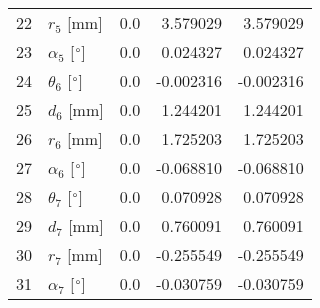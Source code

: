 \documentclass{standalone}%
\begin{document}
\begin{tabular}{llrrr}
22 &              $r_{5}$ [mm] &       0.0 &   3.579029 &   3.579029 \\
23 &  $\alpha_{5}$ [$\degree$] &       0.0 &   0.024327 &   0.024327 \\
24 &  $\theta_{6}$ [$\degree$] &       0.0 &  -0.002316 &  -0.002316 \\
25 &              $d_{6}$ [mm] &       0.0 &   1.244201 &   1.244201 \\
26 &              $r_{6}$ [mm] &       0.0 &   1.725203 &   1.725203 \\
27 &  $\alpha_{6}$ [$\degree$] &       0.0 &  -0.068810 &  -0.068810 \\
28 &  $\theta_{7}$ [$\degree$] &       0.0 &   0.070928 &   0.070928 \\
29 &              $d_{7}$ [mm] &       0.0 &   0.760091 &   0.760091 \\
30 &              $r_{7}$ [mm] &       0.0 &  -0.255549 &  -0.255549 \\
31 &  $\alpha_{7}$ [$\degree$] &       0.0 &  -0.030759 &  -0.030759 \\
\bottomrule
\end{tabular}
%
\end{document}
